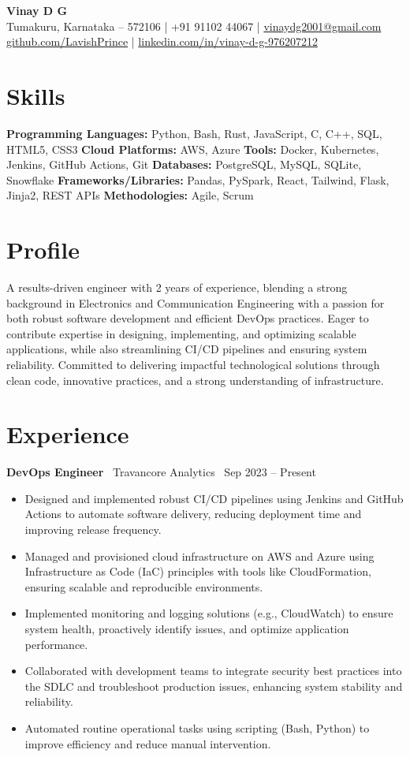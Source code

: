 \documentclass[a4paper,10pt]{article}
\begin{document}
\textbf{\Large Vinay D G} \\Tumakuru, Karnataka – 572106 \quad | \quad +91 91102 44067 \quad | \quad \href{mailto:vinaydg2001@gmail.com}{vinaydg2001@gmail.com} \\\href{https://github.com/LavishPrince}{github.com/LavishPrince} \quad | \quad \href{https://www.linkedin.com/in/vinay-d-g-976207212/}{linkedin.com/in/vinay-d-g-976207212}

\section*{Skills}
\textbf{Programming Languages:} Python, Bash, Rust, JavaScript, C, C++, SQL, HTML5, CSS3
\textbf{Cloud Platforms:} AWS, Azure
\textbf{Tools:} Docker, Kubernetes, Jenkins, GitHub Actions, Git
\textbf{Databases:} PostgreSQL, MySQL, SQLite, Snowflake
\textbf{Frameworks/Libraries:} Pandas, PySpark, React, Tailwind, Flask, Jinja2, REST APIs
\textbf{Methodologies:} Agile, Scrum

\section*{Profile}
A results-driven engineer with 2 years of experience, blending a strong background in Electronics and Communication Engineering with a passion for both robust software development and efficient DevOps practices. Eager to contribute expertise in designing, implementing, and optimizing scalable applications, while also streamlining CI/CD pipelines and ensuring system reliability. Committed to delivering impactful technological solutions through clean code, innovative practices, and a strong understanding of infrastructure.

\section*{Experience}
\textbf{DevOps Engineer} \
Travancore Analytics \ \hfill Sep 2023 – Present
\begin{itemize}[leftmargin=0.5in, label=\textbullet]
    \item Designed and implemented robust CI/CD pipelines using Jenkins and GitHub Actions to automate software delivery, reducing deployment time and improving release frequency.
    \item Managed and provisioned cloud infrastructure on AWS and Azure using Infrastructure as Code (IaC) principles with tools like CloudFormation, ensuring scalable and reproducible environments.
    \item Implemented monitoring and logging solutions (e.g., CloudWatch) to ensure system health, proactively identify issues, and optimize application performance.
    \item Collaborated with development teams to integrate security best practices into the SDLC and troubleshoot production issues, enhancing system stability and reliability.
    \item Automated routine operational tasks using scripting (Bash, Python) to improve efficiency and reduce manual intervention.
\end{itemize}
\end{document}
